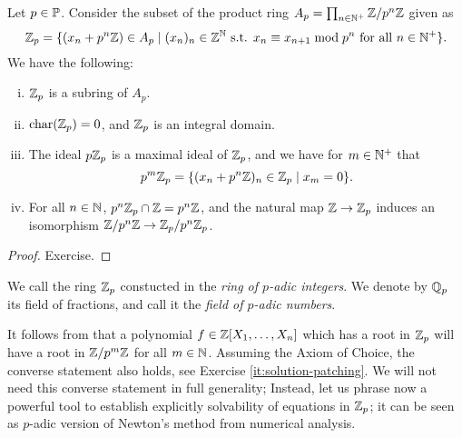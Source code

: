 \documentclass[12pt, leqno, british]{amsart}
\begin{document}
\begin{prop}\label{P:Zp-construction}
Let $p \in \mathbb P$. Consider the subset of the product ring $A_p = \prod_{n \in \mathbb N^+} \mathbb Z/p^n \mathbb Z$ given as
$$ \mathbb Z_p = \lbrace (x_n + p^n\mathbb Z) \in A_p \mid (x_n)_n \in \mathbb Z^\mathbb N \text{ s.t. } x_n \equiv x_{n+1} \bmod p^n \text{ for all } n \in \mathbb N^+ \rbrace.$$
We have the following:
\begin{enumerate}[(i)]
\item $\mathbb Z_p$ is a subring of $A_p$.
\item $\operatorname{char}(\mathbb Z_p) = 0$, and $\mathbb Z_p$ is an integral domain.
\item The ideal $p\mathbb Z_p$ is a maximal ideal of $\mathbb Z_p$, and we have for $m \in \mathbb N^+$ that
$$ p^m\mathbb Z_p = \lbrace (x_n + p^n\mathbb Z)_n \in \mathbb Z_p \mid x_m = 0 \rbrace.$$
\item For all $n \in \mathbb N$, $p^n\mathbb Z_p \cap \mathbb Z = p^n\mathbb Z$, and the natural map $\mathbb Z \to \mathbb Z_p$ induces an isomorphism $\mathbb Z/p^n\mathbb Z \to \mathbb Z_p/p^n\mathbb Z_p$.
\end{enumerate}
\end{prop}
\begin{proof}
Exercise.
\end{proof}
\begin{defi}
We call the ring $\mathbb Z_p$ constucted in  the \emph{ring of $p$-adic integers}.
We denote by $\mathbb Q_p$ its field of fractions, and call it the \emph{field of $p$-adic numbers}.
\end{defi}
It follows from  that a polynomial $f \in \mathbb Z[X_1, \ldots, X_n]$ which has a root in $\mathbb Z_p$ will have a root in $\mathbb Z/p^m\mathbb Z$ for all $m \in \mathbb N$.
Assuming the Axiom of Choice, the converse statement also holds, see Exercise \eqref{it:solution-patching}.
We will not need this converse statement in full generality;
Instead, let us phrase now a powerful tool to establish explicitly solvability of equations in $\mathbb Z_p$; it can be seen as $p$-adic version of Newton's method from numerical analysis.
\end{document}
